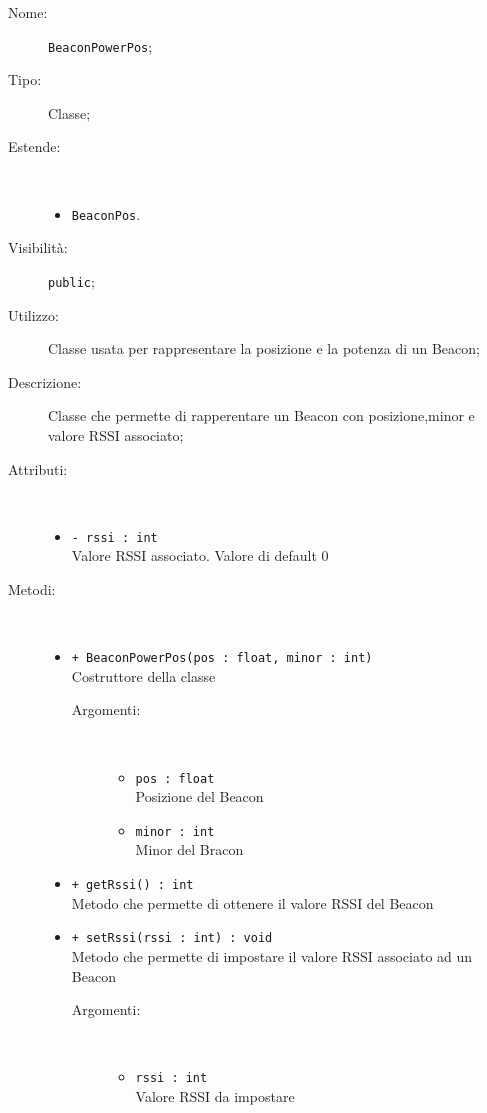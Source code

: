 \documentclass[../DefinizioneDiProdotto.tex]{subfiles}
\begin{document}
\begin{description}
	\item[Nome:] \texttt{BeaconPowerPos};
	\item[Tipo:] Classe;
	\item[Estende:] \
	\begin{itemize}
		\item \texttt{BeaconPos}.
	\end{itemize}
	\item[Visibilità:] \texttt{public};
	\item[Utilizzo:] Classe usata per rappresentare la posizione e la potenza di un Beacon;
	\item[Descrizione:] Classe che permette di rapperentare un Beacon con posizione,minor e valore RSSI associato;
	\item[Attributi:] \
	\begin{itemize}
		\item \texttt{- rssi : int}\\
		Valore RSSI associato. Valore di default 0
		
	\end{itemize}
	\item[Metodi:] \
	\begin{itemize}
		\item \texttt{+ BeaconPowerPos(pos : float, minor : int)}\\
		Costruttore della classe
		\begin{description}
			\item[Argomenti:] \
			\begin{itemize}
				\item \texttt{pos : float}\\
				Posizione del Beacon\item \texttt{minor : int}\\
				Minor del Bracon\end{itemize}
		\end{description}
		\item \texttt{+ getRssi() : int}\\
		Metodo che permette di ottenere il valore RSSI del Beacon
		\item \texttt{+ setRssi(rssi : int) : void}\\
		Metodo che permette di impostare il valore RSSI associato ad un Beacon
		\begin{description}
			\item[Argomenti:] \
			\begin{itemize}
				\item \texttt{rssi : int}\\
				Valore RSSI da impostare\end{itemize}
		\end{description}
	\end{itemize}
\end{description}
\end{document}
